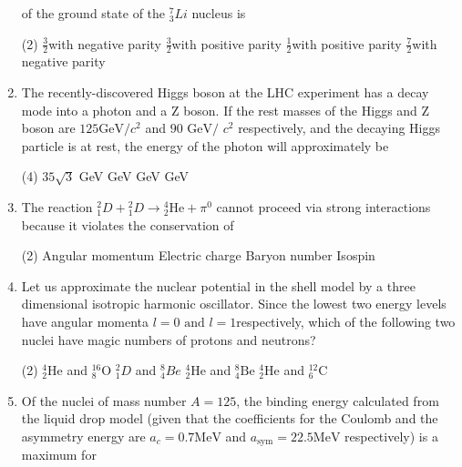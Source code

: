 \begin{enumerate}
	of the ground state of the $ {^7_3}Li$ nucleus is
	{	}
	\begin{tasks}(2)
		\task[\textbf{A.}] $\frac{3}{2}$with negative parity
		\task[\textbf{B.}] $\frac{3}{2}$with positive parity
		\task[\textbf{C.}] $\frac{1}{2}$with positive parity
		\task[\textbf{D.}] $\frac{7}{2}$with negative parity
	\end{tasks}
	\item 	The recently-discovered Higgs boson at the LHC experiment has a decay mode into a photon and a Z boson. If the rest masses of the Higgs and Z boson are $125 \text{GeV/}c ^2$ and $90\text{ GeV/ }c^2$ respectively, and the decaying Higgs particle is at rest, the energy of the photon will approximately be
	{}
	\begin{tasks}(4)
		\task[\textbf{A.}] $35\sqrt{3}$ GeV
		 GeV
		 GeV
		 GeV
	\end{tasks}
	\item 	The reaction ${ }_{1}^{2} D+{ }_{1}^{2} D \rightarrow{ }_{2}^{4} \mathrm{He}+\pi^{0}$ cannot proceed via strong interactions because it violates the conservation of
	{}
	\begin{tasks}(2)
		\task[\textbf{A.}] Angular momentum
		\task[\textbf{B.}] Electric charge
		\task[\textbf{C.}]  Baryon number
		\task[\textbf{D.}] Isospin
	\end{tasks}
	\item Let us approximate the nuclear potential in the shell model by a three dimensional isotropic harmonic oscillator. Since the lowest two energy levels have angular momenta $l = 0\text{ and }l = 1 $respectively, which of the following two nuclei have magic numbers of
	protons and neutrons?
	{	}
	\begin{tasks}(2)
		\task[\textbf{A.}] ${ }_{2}^{4} \mathrm{He}$ and ${ }_{8}^{16} \mathrm{O}$
		\task[\textbf{B.}] ${ }_{1}^{2} D$ and ${ }_{4}^{8} B e$
		\task[\textbf{C.}]  ${ }_{2}^{4} \mathrm{He}$ and ${ }_{4}^{8} \mathrm{Be}$
		\task[\textbf{D.}] ${ }_{2}^{4} \mathrm{He}$ and ${ }_{6}^{12} \mathrm{C}$
	\end{tasks}
	\item 	Of the nuclei of mass number $A=125$, the binding energy calculated from the liquid drop model (given that the coefficients for the Coulomb and the asymmetry energy are $a_{c}=0.7 \mathrm{MeV}$ and $a_{\mathrm{sym}}=22.5 \mathrm{MeV}$ respectively) is a maximum for

\end{enumerate}

